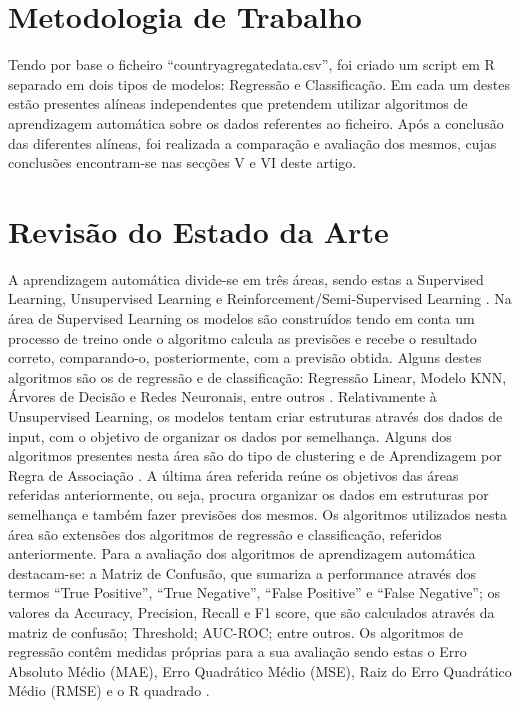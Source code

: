 \documentclass[conference]{IEEEtran}
\begin{document}
\section{Metodologia de Trabalho} %
Tendo por base o ficheiro “countryagregatedata.csv”\cite{dataFile}, foi criado um script em R separado em dois tipos de modelos: Regressão e Classificação. Em cada um destes estão presentes alíneas independentes que pretendem utilizar algoritmos de aprendizagem automática sobre os dados referentes ao ficheiro. Após a conclusão das diferentes alíneas, foi realizada a comparação e avaliação dos mesmos, cujas conclusões encontram-se nas secções V e VI deste artigo. 



\section{Revisão do Estado da Arte} %
A aprendizagem automática divide-se em três áreas, sendo estas a Supervised Learning, Unsupervised Learning e Reinforcement/Semi-Supervised Learning \cite{algorithms}.
Na área de Supervised Learning os modelos são construídos tendo em conta um processo de treino onde o algoritmo calcula as previsões e recebe o resultado correto, comparando-o, posteriormente, com a previsão obtida. Alguns destes algoritmos são os de regressão e de classificação: Regressão Linear, Modelo KNN, Árvores de Decisão e Redes Neuronais, entre outros \cite{regressionalgorithms}.
Relativamente à Unsupervised Learning, os modelos tentam criar estruturas através dos dados de input, com o objetivo de organizar os dados por semelhança. Alguns dos algoritmos presentes nesta área são do tipo de clustering \cite{clusteringalgorithms} e de Aprendizagem por Regra de Associação \cite{associationrulealgorithms}.
A última área referida reúne os objetivos das áreas referidas anteriormente, ou seja, procura organizar os dados em estruturas por semelhança e também fazer previsões dos mesmos. Os algoritmos utilizados nesta área são extensões dos algoritmos de regressão e classificação, referidos anteriormente.
Para a avaliação dos algoritmos de aprendizagem automática destacam-se: a Matriz de Confusão, que sumariza a performance através dos termos “True Positive”, “True Negative”, “False Positive” e “False Negative”; os valores da Accuracy, Precision, Recall e F1 score, que são calculados através da matriz de confusão; Threshold; AUC-ROC; entre outros. Os algoritmos de regressão contêm medidas próprias para a sua avaliação sendo estas o Erro Absoluto Médio (MAE), Erro Quadrático Médio (MSE), Raiz do Erro Quadrático Médio (RMSE) e o R quadrado \cite{evaluationmetrics}.
\end{document}
